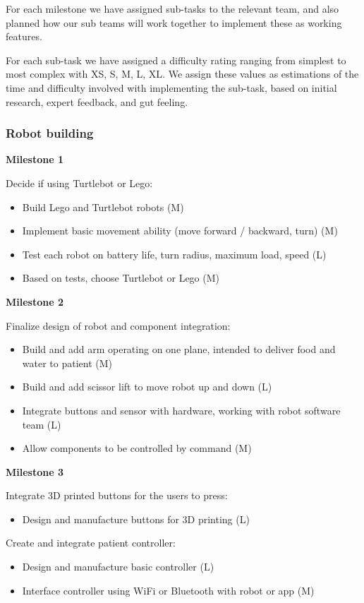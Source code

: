 \documentclass{article}
\begin{document}
For each milestone we have assigned sub-tasks to the relevant team, and also planned how our sub teams will work together to implement these as working features.

For each sub-task we have assigned a difficulty rating ranging from simplest to most complex with XS, S, M, L, XL. We assign these values as estimations of the time and difficulty involved with implementing the sub-task, based on initial research, expert feedback, and gut feeling. 


\subsubsection{Robot building}
{\bf Milestone 1}

Decide if using Turtlebot or Lego:
\begin{itemize}
\item Build Lego and Turtlebot robots (M)
\item Implement basic movement ability (move forward / backward, turn) (M)
\item Test each robot on battery life, turn radius, maximum load, speed (L)
\item Based on tests, choose Turtlebot or Lego (M)
\end{itemize}

{\bf Milestone 2}

Finalize design of robot and component integration:
\begin{itemize}
\item Build and add arm operating on one plane, intended to deliver food and water to patient (M)
\item Build and add scissor lift to move robot up and down (L)
\item Integrate buttons and sensor with hardware, working with robot software team (L)
\item Allow components to be controlled by command (M)
\end{itemize}

{\bf Milestone 3}

Integrate 3D printed buttons for the users to press:
\begin{itemize}
\item Design and manufacture buttons for 3D printing (L)
\end{itemize}

Create and integrate patient controller:
\begin{itemize}
  \item Design and manufacture basic controller (L)
  \item Interface controller using WiFi or Bluetooth with robot or app (M)
\end{itemize}
\end{document}
